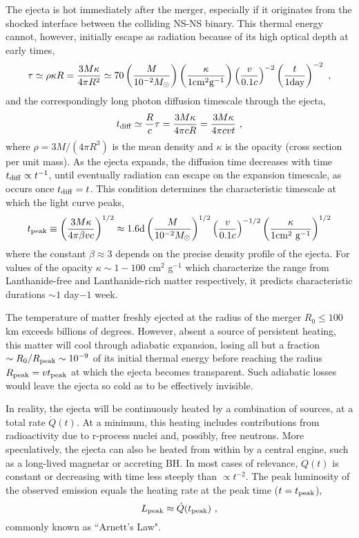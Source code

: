 \documentclass[11pt,a4paper]{article}
\begin{document}
The ejecta is hot immediately after the merger, especially if it originates from the shocked interface between the colliding NS-NS binary. This thermal energy cannot, however, initially escape as radiation because of its high optical depth at early times,
\begin{equation}
\tau \simeq \rho \kappa R = \dfrac{3M \kappa}{4\pi R^2} \simeq 70 \left(\dfrac{M}{10^{-2} M_\odot} \right) \left(\dfrac{\kappa}{1 {\rm cm^2 g^{-1}} } \right) \left(\dfrac{v}{0.1 c} \right)^{-2} \left(\dfrac{t}{1 \rm day} \right)^{-2} ~,
\end{equation}
and the correspondingly long photon diffusion timescale through the ejecta,
\begin{equation}
t_{\rm diff} \simeq \dfrac{R}{c} \tau = \dfrac{3M \kappa}{4\pi c R} = \dfrac{3M \kappa}{4\pi c v t} ~,
\end{equation}
where $\rho = 3M/(4\pi R^3)$ is the mean density and $\kappa$ is the opacity (cross section per unit mass). As the ejecta expands, the diffusion time decreases with time $t_{\rm diff} \propto t^{-1}$, until eventually radiation can escape on the expansion timescale, as occurs once $t_{\rm diff} = t$. This condition determines the characteristic timescale at which the light curve peaks,
\begin{equation}
t_{\rm peak} \equiv \left(\dfrac{3M \kappa}{4\pi \beta v c} \right)^{1/2} \approx 1.6 {\rm d} \left(\dfrac{M}{10^{-2} M_\odot} \right)^{1/2}  \left(\dfrac{v}{0.1 c} \right)^{-1/2} \left(\dfrac{\kappa}{1 {\rm cm^2 ~g^{-1}} } \right)^{1/2} 
\end{equation}
where the constant $\beta \approx 3$ depends on the precise density profile of the ejecta. For values of the opacity $\kappa \sim 1-100$ cm$^2$ g$^{-1}$ which characterize the range from Lanthanide-free and Lanthanide-rich matter respectively, it predicts characteristic durations $\sim 1$ day$-1$ week.

The temperature of matter freshly ejected at the radius of the merger $R_0 \leqslant 100$ km exceeds billions of degrees. However, absent a source of persistent heating, this matter will cool through adiabatic expansion, losing all but a fraction $\sim R_0/R_{\rm peak} \sim 10^{-9}$ of its initial thermal energy before reaching the radius $R_{\rm peak} = v t_{\rm peak}$ at which the ejecta becomes transparent. Such adiabatic losses would leave the ejecta so cold as to be effectively invisible.

In reality, the ejecta will be continuously heated by a combination of sources, at a total rate $\dot{Q}(t)$. At a minimum, this heating includes contributions from radioactivity due to r-process nuclei and, possibly, free neutrons. More speculatively, the ejecta can also be heated from within by a central engine, such as a long-lived magnetar or accreting BH. In most cases of relevance, $\dot{Q}(t)$ is constant or decreasing with time less steeply than $\propto t^{-2}$. The peak luminosity of the observed emission equals the heating rate at the peak time ($t = t_{\rm peak}$),
\begin{equation}
L_{\rm peak} \approx \dot{Q}(t_{\rm peak}) ~,
\end{equation}
commonly known as ``Arnett's Law".
\end{document}
